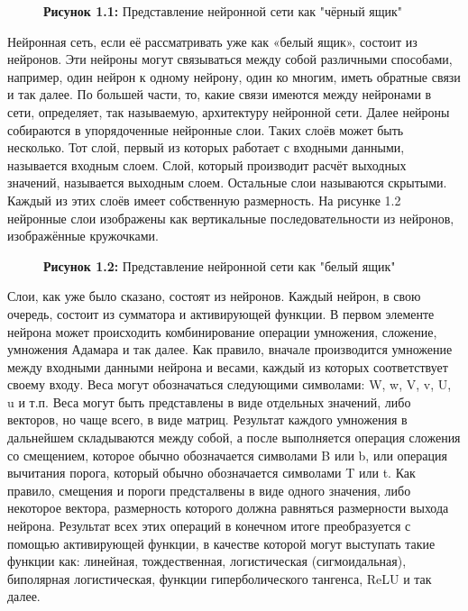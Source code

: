 {  \begin{figure}[htb]
    \centering
    \def\svgwidth{\textwidth}
    
    \caption*{{\bfseries Рисунок 1.1:} Представление нейронной сети как "чёрный ящик"}
    \label{fig:NNBlackBox}
  \end{figure}

  \par \redline Нейронная сеть, если её рассматривать уже как «белый ящик», состоит из нейронов. Эти нейроны могут связываться между собой различными способами, например, один нейрон к одному нейрону, один ко многим, иметь обратные связи и так далее. По большей части, то, какие связи имеются между нейронами в сети, определяет, так называемую, архитектуру нейронной сети. Далее нейроны собираются в упорядоченные нейронные слои. Таких слоёв может быть несколько. Тот слой, первый из которых работает с входными данными, называется входным слоем. Слой, который производит расчёт выходных значений, называется выходным слоем. Остальные слои называются скрытыми. Каждый из этих слоёв имеет собственную размерность. На рисунке 1.2 нейронные слои изображены как вертикальные последовательности из нейронов, изображённые кружочками.

  \begin{figure}[htb]
    \centering
    \def\svgwidth{\textwidth}
    
    \caption*{{\bfseries Рисунок 1.2:} Представление нейронной сети как "белый ящик"}
    \label{fig:NNWhiteBox}
  \end{figure}

  \par \redline Слои, как уже было сказано, состоят из нейронов. Каждый нейрон, в свою очередь, состоит из сумматора и активирующей функции. В первом элементе нейрона может происходить комбинирование операции умножения, сложение, умножения Адамара и так далее. Как правило, вначале производится умножение между входными данными нейрона и весами, каждый из которых соответствует своему входу. Веса могут обозначаться следующими символами: W, w, V, v, U, u и т.п. Веса могут быть представлены в виде отдельных значений, либо векторов, но чаще всего, в виде матриц. Результат каждого умножения в дальнейшем складываются между собой, а после выполняется операция сложения со смещением, которое обычно обозначается символами B или b, или операция вычитания порога, который обычно обозначается символами T или t. Как правило, смещения и пороги предсталвены в виде одного значения, либо некоторое вектора, размерность которого должна равняться размерности выхода нейрона.  Результат всех этих операций в конечном итоге преобразуется с помощью активирующей функции, в качестве которой могут выступать такие функции как: линейная, тождественная, логистическая (сигмоидальная), биполярная логистическая, функции гиперболического тангенса, ReLU и так далее.  

}
